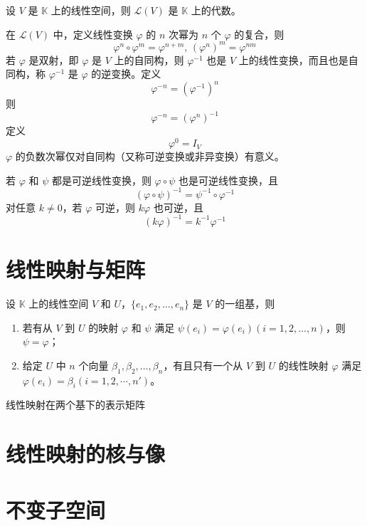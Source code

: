 \begin{theorem}
  设 $V$ 是 $\mathbb{K}$ 上的线性空间，则 $\mathcal{L}(V)$ 是 $\mathbb{K}$ 上的代数。
\end{theorem}

\begin{proposition}
  在 $\mathcal{L}(V)$ 中，定义线性变换 $\varphi$ 的 $n$ 次幂为 $n$ 个 $\varphi$ 的复合，则
  \[\varphi^n \circ \varphi^m = \varphi^{n + m},\, (\varphi^n)^m = \varphi^{nm}\]
  若 $\varphi$ 是双射，即 $\varphi$ 是 $V$ 上的自同构，则 $\varphi^{-1}$ 也是 $V$ 上的线性变换，而且也是自同构，称 $\varphi^{-1}$ 是 $\varphi$ 的逆变换。定义
  \[\varphi^{-n} = (\varphi^{-1})^n\]
  则
  \[\varphi^{-n} = (\varphi^n)^{-1}\]
  定义
  \[\varphi^0 = I_V\]
  $\varphi$ 的负数次幂仅对自同构（又称可逆变换或非异变换）有意义。
\end{proposition}

\begin{proposition}
  若 $\varphi$ 和 $\psi$ 都是可逆线性变换，则 $\varphi \circ \psi$ 也是可逆线性变换，且
  \[(\varphi \circ \psi)^{-1} = \psi^{-1} \circ \varphi^{-1}\]
  对任意 $k \ne 0$，若 $\varphi$ 可逆，则 $k\varphi$ 也可逆，且
  \[(k\varphi)^{-1} = k^{-1}\varphi^{-1}\]
\end{proposition}



\section{线性映射与矩阵}

\begin{lemma}
  设 $\mathbb{K}$ 上的线性空间 $V$ 和 $U$，$\{e_1,e_2, \ldots ,e_n\}$ 是 $V$ 的一组基，则
  \begin{enumerate}
    \item 若有从 $V$ 到 $U$ 的映射 $\varphi$ 和 $\psi$ 满足 $\psi(e_i) = \varphi(e_i)(i = 1,2, \ldots ,n)$，则 $\psi = \varphi$；
    \item 给定 $U$ 中 $n$ 个向量 $\beta_1,\beta_2, \ldots ,\beta_n$，有且只有一个从 $V$ 到 $U$ 的线性映射 $\varphi$ 满足 $\varphi(e_i) = \beta_i(i = 1,2,\cdots,n')$。
  \end{enumerate}
\end{lemma}

\begin{definition}{线性映射在两个基下的表示矩阵}
  
\end{definition}



\section{线性映射的核与像}







\section{不变子空间}






